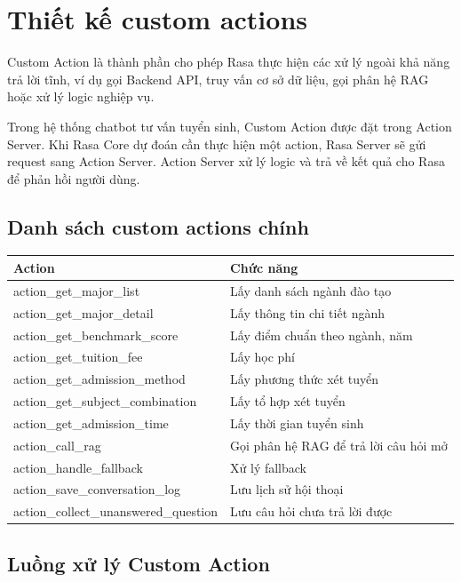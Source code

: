 ﻿\section{Thiết kế custom actions}

Custom Action là thành phần cho phép Rasa thực hiện các xử lý ngoài khả năng trả lời tĩnh, ví dụ gọi Backend API, truy vấn cơ sở dữ liệu, gọi phân hệ RAG hoặc xử lý logic nghiệp vụ.

Trong hệ thống chatbot tư vấn tuyển sinh, Custom Action được đặt trong Action Server. Khi Rasa Core dự đoán cần thực hiện một action, Rasa Server sẽ gửi request sang Action Server. Action Server xử lý logic và trả về kết quả cho Rasa để phản hồi người dùng.

\subsection*{Danh sách custom actions chính}

\begin{table}[H]
\centering
\begin{tabular}{|l|p{9cm}|}
\hline
\textbf{Action} & \textbf{Chức năng} \\
\hline
action\_get\_major\_list & Lấy danh sách ngành đào tạo \\
\hline
action\_get\_major\_detail & Lấy thông tin chi tiết ngành \\
\hline
action\_get\_benchmark\_score & Lấy điểm chuẩn theo ngành, năm \\
\hline
action\_get\_tuition\_fee & Lấy học phí \\
\hline
action\_get\_admission\_method & Lấy phương thức xét tuyển \\
\hline
action\_get\_subject\_combination & Lấy tổ hợp xét tuyển \\
\hline
action\_get\_admission\_time & Lấy thời gian tuyển sinh \\
\hline
action\_call\_rag & Gọi phân hệ RAG để trả lời câu hỏi mở \\
\hline
action\_handle\_fallback & Xử lý fallback \\
\hline
action\_save\_conversation\_log & Lưu lịch sử hội thoại \\
\hline
action\_collect\_unanswered\_question & Lưu câu hỏi chưa trả lời được \\
\hline
\end{tabular}
\end{table}

\subsection*{Luồng xử lý Custom Action}

